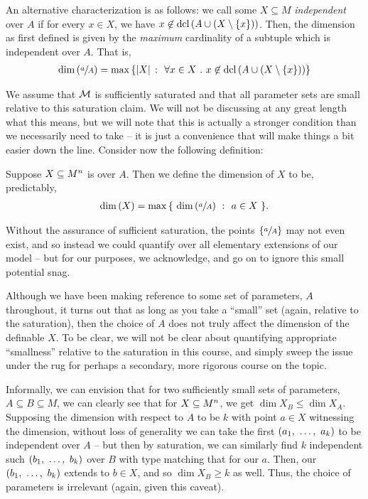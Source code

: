 An alternative characterization is as follows: we call some $X \subseteq M$ \emph{independent} over $A$ if for every $x \in X$, we have $x \not\in \dcl{A \cup (X \setminus \{ x \})}$. Then, the dimension as first defined is given by the \emph{maximum} cardinality of a subtuple which is independent over $A$. That is,
  \begin{align*}
    \dim{ \sfrac{a}{A} } = \max{ \left\{ \card{X} \ \colon \ \forall x \in X \ . \ x \not\in \dcl{A \cup (X \setminus \{ x \})} \right\} }
  \end{align*}

We assume that $\M$ is sufficiently saturated and that all parameter sets are small relative to this saturation claim. We will not be discussing at any great length what this means, but we will note that this is actually a stronger condition than we necessarily need to take -- it is just a convenience that will make things a bit easier down the line. Consider now the following definition:

\begin{definition}
  Suppose $\XMn[X]{n}$ is  over $A$. Then we define the dimension of $X$ to be, predictably,
    \begin{align*}
      \dim{X} = \max{ \left\{ \ \dim{\sfrac{a}{A}} \ \colon \ a \in X \ \right\} }.
    \end{align*}
    \label{defn:alg_dim}
\end{definition}

\begin{remark}
  Without the assurance of sufficient saturation, the points $\left\{ \sfrac{a}{A} \right\}$ may not even exist, and so instead we could quantify over all elementary extensions of our model -- but for our purposes, we acknowledge, and go on to ignore this small potential snag.
\end{remark}

Although we have been making reference to some set of parameters, $A$ throughout, it turns out that as long as you take a ``small'' set (again, relative to the saturation), then the choice of $A$ does not truly affect the dimension of the definable $X$. To be clear, we will not be clear about quantifying appropriate ``smallness'' relative to the saturation in this course, and simply sweep the issue under the rug for perhaps a secondary, more rigorous course on the topic.

Informally, we can envision that for two sufficiently small sets of parameters, $A \subseteq B \subseteq M$, we can clearly see that for  $\XMn{n}$, we get $\dim{X}_B \leq \dim{X}_A$. Supposing the dimension with respect to $A$ to be $k$ with point $a \in X$ witnessing the dimension, without loss of generality we can take the first $(\vonevm{a}{k})$ to be independent over $A$ -- but then by saturation, we can similarly find $k$ independent such $(\vonevm{b}{k})$ over $B$ with type matching that for our $a$. Then, our $(\vonevm{b}{k})$ extends to $b \in X$, and so $\dim{X}_B \geq k$ as well. Thus, the choice of parameters is irrelevant (again, given this caveat).

